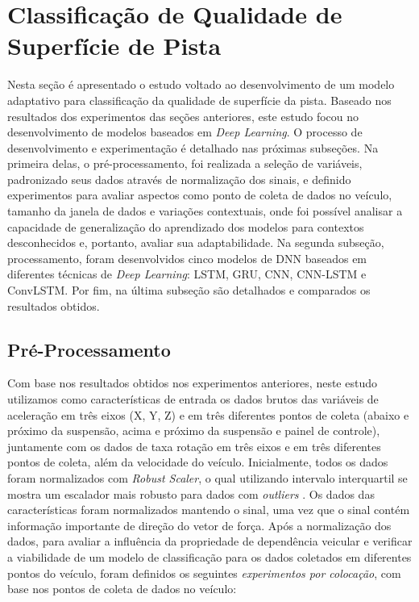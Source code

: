 \chapter{Classificação de Qualidade de Superfície de Pista}
\label{cap:classificacao_qualidade}

Nesta seção é apresentado o estudo voltado ao desenvolvimento de um modelo adaptativo para classificação da qualidade de superfície da pista. Baseado nos resultados dos experimentos das seções anteriores, este estudo focou no desenvolvimento de modelos baseados em \textit{Deep Learning}. O processo de desenvolvimento e experimentação é detalhado nas próximas subseções. Na primeira delas, o pré-processamento, foi realizada a seleção de variáveis, padronizado seus dados através de normalização dos sinais, e definido experimentos para avaliar aspectos como ponto de coleta de dados no veículo, tamanho da janela de dados e variações contextuais, onde foi possível analisar a capacidade de generalização do aprendizado dos modelos para contextos desconhecidos e, portanto, avaliar sua adaptabilidade. Na segunda subseção, processamento, foram desenvolvidos cinco modelos de DNN baseados em diferentes técnicas de \textit{Deep Learning}: LSTM, GRU, CNN, CNN-LSTM e ConvLSTM. Por fim, na última subseção são detalhados e comparados os resultados obtidos.

\section{Pré-Processamento}

Com base nos resultados obtidos nos experimentos anteriores, neste estudo utilizamos como características de entrada os dados brutos das variáveis de aceleração em três eixos (X, Y, Z) e em três diferentes pontos de coleta (abaixo e próximo da suspensão, acima e próximo da suspensão e painel de controle), juntamente com os dados de taxa rotação em três eixos e em três diferentes pontos de coleta, além da velocidade do veículo. Inicialmente, todos os dados foram normalizados com \textit{Robust Scaler}, o qual utilizando intervalo interquartil se mostra um escalador mais robusto para dados com \textit{outliers} \cite{Vaitheeshwari2019}. Os dados das características foram normalizados mantendo o sinal, uma vez que o sinal contém informação importante de direção do vetor de força. Após a normalização dos dados, para avaliar a influência da propriedade de dependência veicular e verificar a viabilidade de um modelo de classificação para os dados coletados em diferentes pontos do veículo, foram definidos os seguintes \emph{experimentos por colocação}, com base nos pontos de coleta de dados no veículo:

